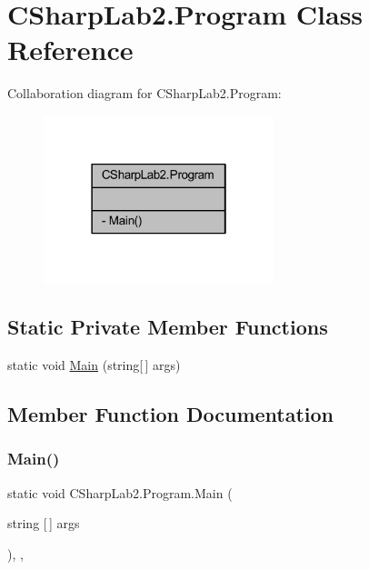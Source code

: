 \hypertarget{class_c_sharp_lab2_1_1_program}{}\section{C\+Sharp\+Lab2.\+Program Class Reference}
\label{class_c_sharp_lab2_1_1_program}


Collaboration diagram for C\+Sharp\+Lab2.\+Program\+:
\nopagebreak
\begin{figure}[H]
\begin{center}
\leavevmode
\includegraphics[width=190pt]{class_c_sharp_lab2_1_1_program__coll__graph}
\end{center}
\end{figure}
\subsection*{Static Private Member Functions}
\begin{DoxyCompactItemize}
\item 
static void \hyperlink{class_c_sharp_lab2_1_1_program_ad1384680a182efdc7cf9f8eb73540648}{Main} (string\mbox{[}$\,$\mbox{]} args)
\end{DoxyCompactItemize}


\subsection{Member Function Documentation}
\hypertarget{class_c_sharp_lab2_1_1_program_ad1384680a182efdc7cf9f8eb73540648}{}\label{class_c_sharp_lab2_1_1_program_ad1384680a182efdc7cf9f8eb73540648} 
\subsubsection{\texorpdfstring{Main()}{Main()}}
{\footnotesize\ttfamily static void C\+Sharp\+Lab2.\+Program.\+Main (\begin{DoxyParamCaption}\item[{string \mbox{[}$\,$\mbox{]}}]{args }\end{DoxyParamCaption})\hspace{0.3cm}{\ttfamily [inline]}, {\ttfamily [static]}, {\ttfamily [private]}}

